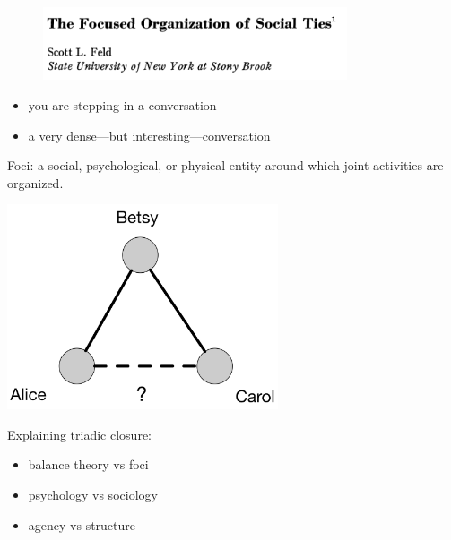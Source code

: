 \documentclass{beamer}
\begin{document}
\begin{frame}

\begin{figure}
  \centering
  \includegraphics[width=0.8\textwidth]{figures/feld_focused_1981_title}
\end{figure}

\pause

\begin{itemize}
\item you are stepping in a conversation
\pause
\item a very dense---but interesting---conversation
\end{itemize}

\end{frame}
\begin{frame}

Foci: a social, psychological, or physical entity around which joint activities are organized. 

\end{frame}
\begin{frame}

\begin{center}
 \includegraphics[width=0.6\textwidth]{figures/triadic_closure}
\end{center}

Explaining triadic closure:
\begin{itemize}
\item balance theory vs foci
\item psychology vs sociology
\item agency vs structure
\end{itemize}


\end{frame}
\end{document}
